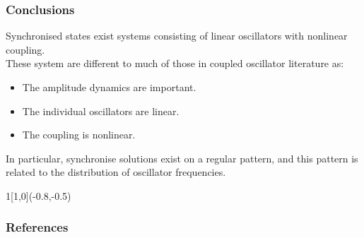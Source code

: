 \documentclass[10pt,reqno]{beamer}
\begin{document}
\begin{frame}
\frametitle{Conclusions}
Synchronised states exist systems consisting of linear oscillators with nonlinear coupling.\\
These system are different to much of those in coupled oscillator literature as:
\begin{itemize}
\item The amplitude dynamics are important.
\item The individual oscillators are linear.
\item The coupling is nonlinear. 
\end{itemize}

In particular, synchronise solutions exist on a regular pattern, and this pattern is related to the distribution of oscillator frequencies.
\begin{textblock}{1}[1,0](-0.8,-0.5)
\end{textblock}

\end{frame}
\appendix
\begin{frame}[allowframebreaks]
\frametitle{References}
\footnotesize
\printbibliography
\end{frame}
\end{document}
